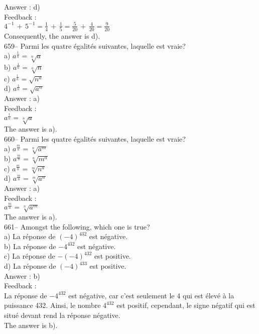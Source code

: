 ﻿\documentclass[letterpaper, 12pt]{article}
\begin{document}
Answer : d)\\

Feedback : \\[2mm]
$4^{-1}\,+\,5^{-1}=\frac{1}{4}\,+\,\frac{1}{5}=\frac{5}{20}\,+\,\frac{4}{20}=\frac{9}{20}$\\[2mm]
Consequently, the answer is d).\\

659-- Parmi les quatre \'egalit\'es suivantes, laquelle est vraie?\\
a) $a^{\frac{1}{n}}=\sqrt[n]{a}$\\[2mm]
b) $a^{\frac{1}{n}}=\sqrt[a]{n}$\\[2mm]
c) $a^{\frac{1}{n}}=\sqrt{n^{a}}$\\[2mm]
d) $a^{\frac{1}{n}}=\sqrt{a^{n}}$\\

Answer : a)\\

Feedback : \\
$a^{\frac{1}{n}}=\sqrt[n]{a}$\\
The answer is a).\\

660-- Parmi les quatre \'egalit\'es suivantes, laquelle est vraie?\\
a) $a^{\frac{m}{n}}=\sqrt[n]{a^{m}}$\\[2mm]
b) $a^{\frac{m}{n}}=\sqrt[n]{m^{a}}$\\[2mm]
c) $a^{\frac{m}{n}}=\sqrt[m]{n^{a}}$\\[2mm]
d) $a^{\frac{m}{n}}=\sqrt[m]{a^{n}}$\\

Answer : a)\\

Feedback : \\
$a^{\frac{m}{n}}=\sqrt[n]{a^{m}}$\\
The answer is a).\\

661-- Amongst the following, which one is true?\\
a) La r\'eponse de $(-4)^{432}$ est n\'egative.\\
b) La r\'eponse de $-4^{432}$ est n\'egative.\\
c) La r\'eponse de $-(-4)^{432}$ est positive.\\
d) La r\'eponse de $(-4)^{433}$ est positive.\\

Answer : b)\\

Feedback : \\
La r\'eponse de $-4^{432}$ est n\'egative, car c'est seulement le 4
qui est \'elev\'e \`a la puissance 432. Ainsi, le nombre $4^{432}$
est positif,
cependant, le signe n\'egatif qui est situ\'e devant rend la r\'eponse
n\'egative.\\
The answer is b).\\
\end{document}
